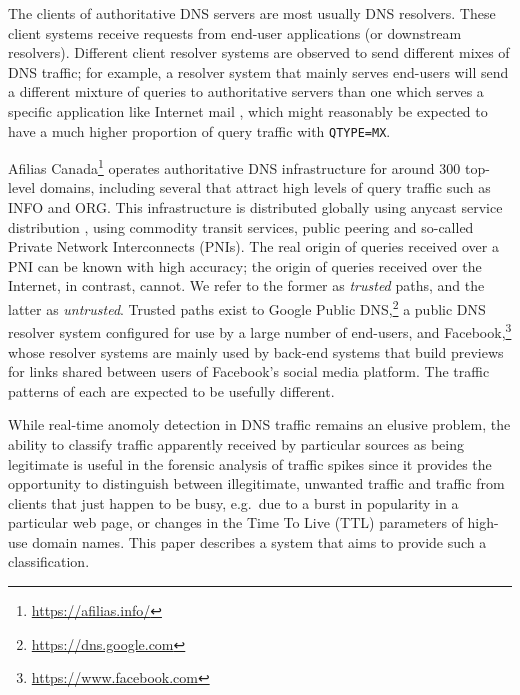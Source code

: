 \documentclass[conference]{IEEEtran}
\let\citep\cite
\begin{document}
The clients of authoritative DNS servers are most usually DNS resolvers.
These client systems receive requests from end-user applications (or
downstream resolvers). Different client resolver systems are observed to
send different mixes of DNS traffic; for example, a resolver system that
mainly serves end-users will send a different mixture of queries to
authoritative servers than one which serves a specific application like
Internet mail \citep{rfc5321}, which might reasonably be expected to
have a much higher proportion of query traffic with \texttt{QTYPE=MX}.

Afilias Canada\footnote{\url{https://afilias.info/}} operates
authoritative DNS infrastructure for around 300 top-level domains,
including several that attract high levels of query traffic such as INFO
and ORG. This infrastructure is distributed globally using anycast
service distribution \citep{rfc4786}, using commodity transit services,
public peering and so-called Private Network Interconnects (PNIs). The
real origin of queries received over a PNI can be known with high
accuracy; the origin of queries received over the Internet, in contrast,
cannot. We refer to the former as \emph{trusted} paths, and the latter
as \emph{untrusted}. Trusted paths exist to Google Public
DNS,\footnote{\url{https://dns.google.com}} a public DNS resolver system
configured for use by a large number of end-users, and
Facebook,\footnote{\url{https://www.facebook.com}} whose resolver
systems are mainly used by back-end systems that build previews for
links shared between users of Facebook's social media platform. The
traffic patterns of each are expected to be usefully different.

While real-time anomoly detection in DNS traffic remains an elusive
problem, the ability to classify traffic apparently received by
particular sources as being legitimate is useful in the forensic
analysis of traffic spikes since it provides the opportunity to
distinguish between illegitimate, unwanted traffic and traffic from
clients that just happen to be busy, e.g.~due to a burst in popularity
in a particular web page, or changes in the Time To Live (TTL)
parameters of high-use domain names. This paper describes a system that
aims to provide such a classification.
\end{document}
